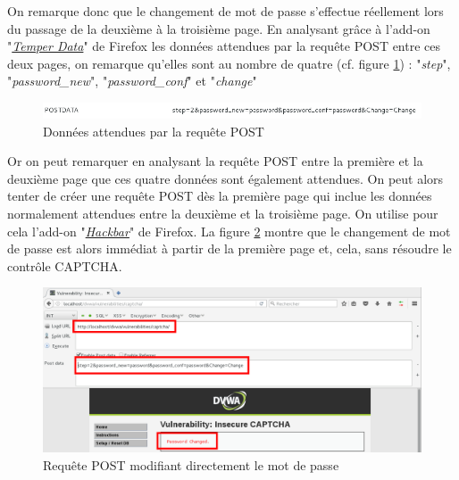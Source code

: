 On remarque donc que le changement de mot de passe s'effectue réellement lors du passage de la deuxième à la troisième page. En analysant grâce à l'add-on "\href{https://addons.mozilla.org/fr/firefox/addon/tamper-data/}{\textit{Temper Data}}" de Firefox les données attendues par la requête POST entre ces deux pages, on remarque qu'elles sont au nombre de quatre (cf. figure \ref{captcha2}) : "\textit{step}", "\textit{password\_new}", "\textit{password\_conf}" et "\textit{change}"

\begin{figure}[!h]
\begin{center}

\includegraphics[scale=0.6]{images/captcha2.png}

\caption{Données attendues par la requête POST}
\label{captcha2}
\end{center}
\end{figure}

Or on peut remarquer en analysant la requête POST entre la première et la deuxième page que ces quatre données sont également attendues. On peut alors tenter de créer une requête POST dès la première page qui inclue les données normalement attendues entre la deuxième et la troisième page. On utilise pour cela l'add-on "\href{https://addons.mozilla.org/fr/firefox/addon/hackbar/}{\textit{Hackbar}}" de Firefox. La figure \ref{captcha3} montre que le changement de mot de passe est alors immédiat à partir de la première page et, cela, sans résoudre le contrôle CAPTCHA.


\begin{figure}[!h]
\begin{center}

\includegraphics[scale=0.4]{images/captcha3.png}

\caption{Requête POST modifiant directement le mot de passe}
\label{captcha3}
\end{center}
\end{figure}


